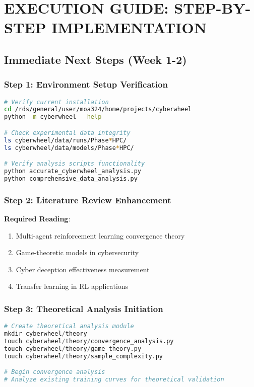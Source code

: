 \documentclass[11pt]{article}
\begin{document}
\section{EXECUTION GUIDE: STEP-BY-STEP IMPLEMENTATION}

\subsection{Immediate Next Steps (Week 1-2)}

\subsubsection{Step 1: Environment Setup Verification}
\begin{lstlisting}[language=bash]
# Verify current installation
cd /rds/general/user/moa324/home/projects/cyberwheel
python -m cyberwheel --help

# Check experimental data integrity
ls cyberwheel/data/runs/Phase*HPC/
ls cyberwheel/data/models/Phase*HPC/

# Verify analysis scripts functionality  
python accurate_cyberwheel_analysis.py
python comprehensive_data_analysis.py
\end{lstlisting}

\subsubsection{Step 2: Literature Review Enhancement}
\textbf{Required Reading}:
\begin{enumerate}
\item Multi-agent reinforcement learning convergence theory
\item Game-theoretic models in cybersecurity
\item Cyber deception effectiveness measurement
\item Transfer learning in RL applications
\end{enumerate}

\subsubsection{Step 3: Theoretical Analysis Initiation}
\begin{lstlisting}[language=python]
# Create theoretical analysis module
mkdir cyberwheel/theory
touch cyberwheel/theory/convergence_analysis.py
touch cyberwheel/theory/game_theory.py
touch cyberwheel/theory/sample_complexity.py

# Begin convergence analysis
# Analyze existing training curves for theoretical validation
\end{lstlisting}
\end{document}
